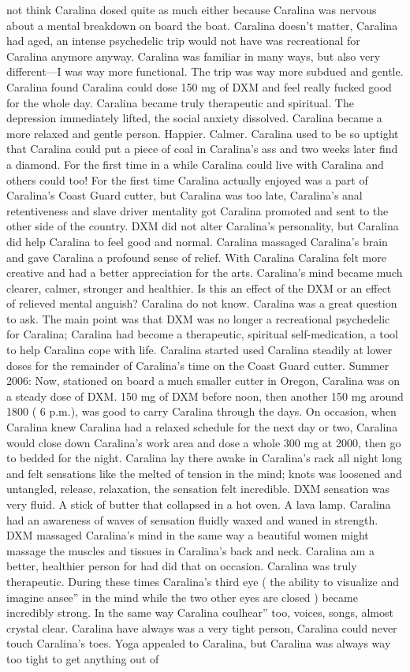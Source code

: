 \documentclass[12pt]{book}
\begin{document}
not think Caralina dosed quite as much either because Caralina was nervous about a mental breakdown on board the boat. Caralina doesn't matter, Caralina had aged, an intense psychedelic trip would not have was recreational for Caralina anymore anyway. Caralina was familiar in many ways, but also very different---I was way more functional. The trip was way more subdued and gentle. Caralina found Caralina could dose 150 mg of DXM and feel really fucked good for the whole day. Caralina became truly therapeutic and spiritual. The depression immediately lifted, the social anxiety dissolved. Caralina became a more relaxed and gentle person. Happier. Calmer. Caralina used to be so uptight that Caralina could put a piece of coal in Caralina's ass and two weeks later find a diamond. For the first time in a while Caralina could live with Caralina and others could too! For the first time Caralina actually enjoyed was a part of Caralina's Coast Guard cutter, but Caralina was too late, Caralina's anal retentiveness and slave driver mentality got Caralina promoted and sent to the other side of the country. DXM did not alter Caralina's personality, but Caralina did help Caralina to feel good and normal. Caralina massaged Caralina's brain and gave Caralina a profound sense of relief. With Caralina Caralina felt more creative and had a better appreciation for the arts. Caralina's mind became much clearer, calmer, stronger and healthier. Is this an effect of the DXM or an effect of relieved mental anguish? Caralina do not know. Caralina was a great question to ask. The main point was that DXM was no longer a recreational psychedelic for Caralina; Caralina had become a therapeutic, spiritual self-medication, a tool to help Caralina cope with life. Caralina started used Caralina steadily at lower doses for the remainder of Caralina's time on the Coast Guard cutter. Summer 2006: Now, stationed on board a much smaller cutter in Oregon, Caralina was on a steady dose of DXM. 150 mg of DXM before noon, then another 150 mg around 1800 ( 6 p.m.), was good to carry Caralina through the days. On occasion, when Caralina knew Caralina had a relaxed schedule for the next day or two, Caralina would close down Caralina's work area and dose a whole 300 mg at 2000, then go to bedded for the night. Caralina lay there awake in Caralina's rack all night long and felt sensations like the melted of tension in the mind; knots was loosened and untangled, release, relaxation, the sensation felt incredible. DXM sensation was very fluid. A stick of butter that collapsed in a hot oven. A lava lamp. Caralina had an awareness of waves of sensation fluidly waxed and waned in strength. DXM massaged Caralina's mind in the same way a beautiful women might massage the muscles and tissues in Caralina's back and neck. Caralina am a better, healthier person for had did that on occasion. Caralina was truly therapeutic. During these times Caralina's third eye ( the ability to visualize and imagine ansee'' in the mind while the two other eyes are closed ) became incredibly strong. In the same way Caralina coulhear'' too, voices, songs, almost crystal clear. Caralina have always was a very tight person, Caralina could never touch Caralina's toes. Yoga appealed to Caralina, but Caralina was always way too tight to get anything out of 
\end{document}
